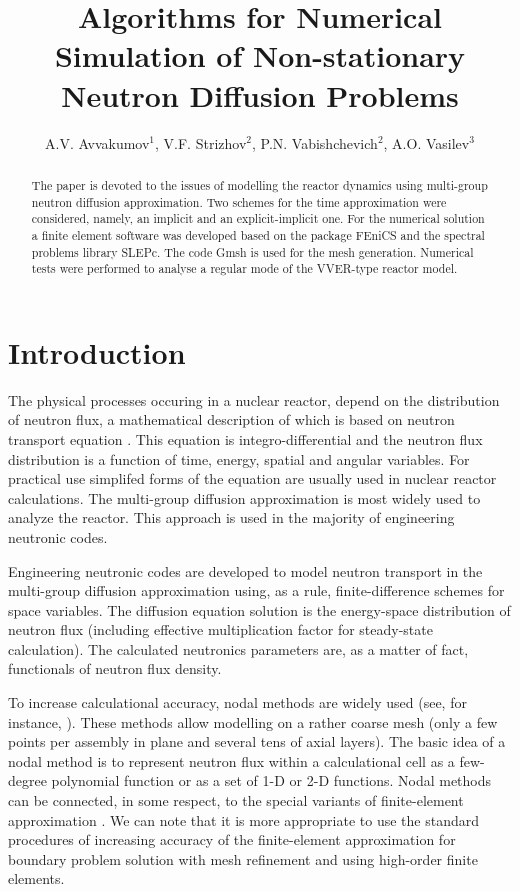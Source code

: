\documentclass{llncs}
\title{Algorithms for Numerical Simulation of Non-stationary Neutron Diffusion Problems}
\author{A.V. Avvakumov$^{1}$, V.F. Strizhov$^{2}$, P.N. Vabishchevich$^{2}$, A.O. Vasilev$^{3}$ }
\institute{$^1$National Research Center \emph{Kurchatov Institute}, Moscow, Russia \\
$^2$Nuclear Safety Institute of RAS,  Moscow, Russia \\
$^3$North-Eastern Federal University, Yakutsk, Russia}
\begin{document}
\maketitle

\begin{abstract}
The paper is devoted to the issues of modelling the reactor dynamics using multi-group neutron diffusion approximation. Two schemes for the time approximation were considered, namely, an implicit and an explicit-implicit one. For the numerical solution a finite element software was developed based on the package FEniCS and the spectral problems library SLEPc. The code Gmsh is used for the mesh generation. Numerical tests were performed to analyse a regular mode of the VVER-type reactor model.

\end{abstract}


\section{Introduction}
\label{s-1}
The physical processes occuring in a nuclear reactor, depend on the distribution of neutron flux, a mathematical description of which is based on neutron transport equation \cite{stacey}. This equation is integro-differential and the neutron flux distribution is a function of time, energy, spatial and angular variables. For practical use simplifed forms of the equation are usually used in nuclear reactor calculations. The multi-group diffusion approximation \cite{sutton1996diffusion} is most widely used to analyze the reactor. This approach is used in the majority of engineering neutronic codes. 

Engineering neutronic codes are developed to model neutron transport in the multi-group diffusion approximation using, as a rule, finite-difference schemes for space variables.
The diffusion equation solution is the energy-space distribution of neutron flux (including effective multiplication factor for steady-state calculation). The calculated neutronics parameters are, as a matter of fact, functionals of neutron flux density. 

To increase calculational accuracy, nodal methods are widely used
(see, for instance, \cite{lawrence1986progress}). These methods allow modelling on a rather coarse mesh (only a few points per assembly in plane and several tens of axial layers).
The basic idea of a nodal method is to represent neutron flux within a calculational cell as a few-degree polynomial function or as a set of 1-D or 2-D functions. Nodal methods can be connected, in some respect, to the special variants of finite-element approximation \cite{grossman2007nodal}. We can note that it is more appropriate to use the standard procedures of increasing accuracy of the finite-element approximation for boundary problem solution with mesh refinement and using high-order finite elements.
\end{document}
